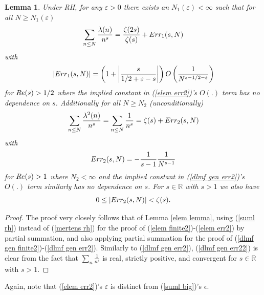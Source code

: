 \documentclass[11pt,article]{amsart}
\numberwithin{equation}{section}
\newtheorem{lemma}{Lemma}
\numberwithin{equation}{section}
\numberwithin{lemma}{section}
\numberwithin{prop}{section}
\begin{document}
\begin{lemma}
Under RH, for any $\varepsilon>0$ there exists an $N_{1}(\varepsilon)<\infty$ such that for all $N\geq N_{1}(\varepsilon)$ 
\begin{align}
\sum_{n\leq N}\frac{\lambda(n)}{n^{s}}=\frac{\zeta(2s)}{\zeta(s)}+\textnormal{Err}_{1}(s,N) \label{elem finite2}
\end{align}
with 
\begin{align}
\left|\textnormal{Err}_{1}(s,N)\right|=\left(1+\left|\frac{s}{1/2+\varepsilon-s}\right|\right)O\left(\frac{1}{N^{s-1/2-\varepsilon}}\right) \label{elem err2}
\end{align}
for $\textnormal{Re}(s)>1/2$ where the implied constant in (\ref{elem err2})'s $O(.)$ term has no dependence on $s$. Additionally for all $N\geq N_{2}$ (unconditionally)
\begin{align}
\sum_{n\leq N}\frac{\lambda^{2}(n)}{n^{s}}=\sum_{n\leq N}\frac{1}{n^{s}}=\zeta(s)+\textnormal{Err}_{2}(s,N) \label{dlmf gen finite2}
\end{align}
with
\begin{align}
\textnormal{Err}_{2}(s,N)=-\frac{1}{s-1}\frac{1}{N^{s-1}} \label{dlmf gen err2}
\end{align}
for $\textnormal{Re}(s)>1$ where $N_{2}<\infty$ and the implied constant in (\ref{dlmf gen err2})'s $O(.)$ term similarly has no dependence on $s$. For $s\in \mathbb{R}$ with $s>1$ we also have 
\begin{equation}
0\leq \left|\textnormal{Err}_{2}(s,N)\right|<\zeta(s). \label{dlmf gen err22}
\end{equation}
\label{elem lemma2}
\end{lemma}
\begin{proof}
The proof very closely follows that of Lemma \ref{elem lemma}, using (\ref{suml rh}) instead of (\ref{mertens rh}) for the proof of (\ref{elem finite2})-(\ref{elem err2}) by partial summation, and also applying partial summation for the proof of (\ref{dlmf gen finite2})-(\ref{dlmf gen err2}). Similarly to (\ref{dlmf gen err2}), (\ref{dlmf gen err22}) is clear from the fact that $\sum_{n}\frac{1}{n^{s}}$ is real, strictly positive, and convergent for $s\in \mathbb{R}$ with $s>1$. 
\end{proof}

Again, note that (\ref{elem err2})'s $\varepsilon$ is distinct from (\ref{suml big})'s $\epsilon$. 
\end{document}
